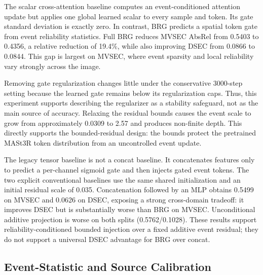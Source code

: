 \documentclass[10pt]{article}
\begin{document}
The scalar cross-attention baseline computes an event-conditioned attention
update but applies one global learned scalar to every sample and token.  Its
gate standard deviation is exactly zero.  In contrast, BRG predicts a spatial
token gate from event reliability statistics.  Full BRG reduces MVSEC AbsRel
from 0.5403 to 0.4356, a relative reduction of 19.4\%, while also improving
DSEC from 0.0866 to 0.0844.  This gap is largest on MVSEC, where event sparsity
and local reliability vary strongly across the image.

Removing gate regularization changes little under the conservative 3000-step
setting because the learned gate remains below its regularization caps.  Thus,
this experiment supports describing the regularizer as a stability safeguard,
not as the main source of accuracy.  Relaxing the residual bounds causes the
event scale to grow from approximately 0.0309 to 2.57 and produces non-finite
depth.  This directly supports the bounded-residual design: the bounds protect
the pretrained MASt3R token distribution from an uncontrolled event update.

The legacy tensor baseline is not a concat baseline.  It concatenates features
only to predict a per-channel sigmoid gate and then injects gated event tokens.
The two explicit conventional baselines use the same shared initialization and
an initial residual scale of 0.035.  Concatenation followed by an MLP obtains
0.5499 on MVSEC and 0.0626 on DSEC, exposing a strong cross-domain tradeoff:
it improves DSEC but is substantially worse than BRG on MVSEC.  Unconditional
additive projection is worse on both splits (0.5762/0.1028).  These results
support reliability-conditioned bounded injection over a fixed additive event
residual; they do not support a universal DSEC advantage for BRG over concat.

\subsection{Event-Statistic and Source Calibration}
\end{document}
